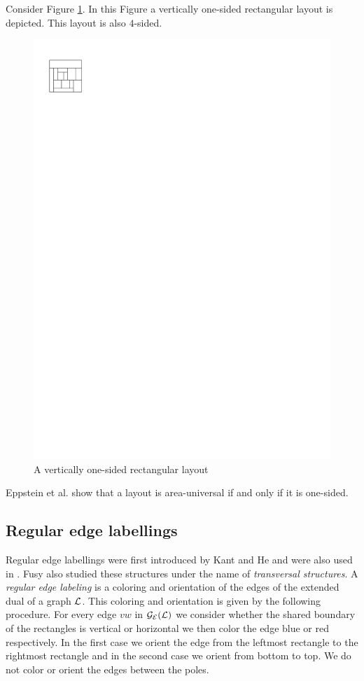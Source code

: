   Consider Figure \ref{fig:rect:vertonesided}. In this Figure a vertically one-sided rectangular layout is depicted. This layout is also $4$-sided.
  \begin{figure}[h]
    \centering
    \includegraphics[scale=1]{rectangularDuals/img/vertonesided}
    \caption{A vertically one-sided rectangular layout}
    \label{fig:rect:vertonesided}
  \end{figure}

  Eppstein et al. \cite{Eppstein2012} show that a layout is area-universal if and only if it is one-sided.

\subsection{Regular edge labellings}
  Regular edge labellings were first introduced by Kant and He \cite{Kant1997} and were also used in \cite{Eppstein2012}. Fusy also studied these structures \cite{Fusy2006,Fusy2009} under the name of \emph{transversal structures}.
  A \emph{regular edge labeling} is a coloring and orientation of the edges of the extended dual of a graph $\mathcal{L}$. This coloring and orientation is given by the following procedure. For every edge $vw$ in $\mathcal{G}_{\mathcal{E}}(\mathcal{L})$ we consider whether the shared boundary of the rectangles is vertical or horizontal we then color the edge blue or red respectively. In the first case we orient the edge from the leftmost rectangle to the rightmost rectangle and in the second case we orient from bottom to top. We do not color or orient the edges between the poles.

